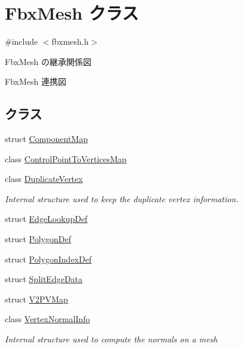 \hypertarget{class_fbx_mesh}{}\section{Fbx\+Mesh クラス}
\label{class_fbx_mesh}


{\ttfamily \#include $<$fbxmesh.\+h$>$}



Fbx\+Mesh の継承関係図


Fbx\+Mesh 連携図
\subsection*{クラス}
\begin{DoxyCompactItemize}
\item 
struct \hyperlink{struct_fbx_mesh_1_1_component_map}{Component\+Map}
\item 
class \hyperlink{class_fbx_mesh_1_1_control_point_to_vertices_map}{Control\+Point\+To\+Vertices\+Map}
\item 
class \hyperlink{class_fbx_mesh_1_1_duplicate_vertex}{Duplicate\+Vertex}
\begin{DoxyCompactList}\small\item\em Internal structure used to keep the duplicate vertex information. \end{DoxyCompactList}\item 
struct \hyperlink{struct_fbx_mesh_1_1_edge_lookup_def}{Edge\+Lookup\+Def}
\item 
struct \hyperlink{struct_fbx_mesh_1_1_polygon_def}{Polygon\+Def}
\item 
struct \hyperlink{struct_fbx_mesh_1_1_polygon_index_def}{Polygon\+Index\+Def}
\item 
struct \hyperlink{struct_fbx_mesh_1_1_split_edge_data}{Split\+Edge\+Data}
\item 
struct \hyperlink{struct_fbx_mesh_1_1_v2_p_v_map}{V2\+P\+V\+Map}
\item 
class \hyperlink{class_fbx_mesh_1_1_vertex_normal_info}{Vertex\+Normal\+Info}
\begin{DoxyCompactList}\small\item\em Internal structure used to compute the normals on a mesh \end{DoxyCompactList}\end{DoxyCompactItemize}
